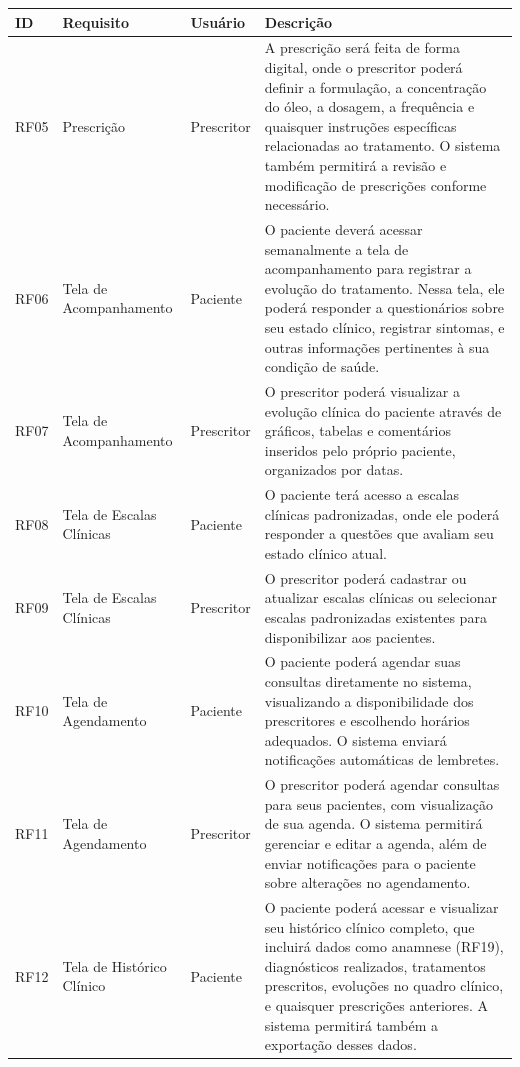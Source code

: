 \href{}{}\documentclass[12pt,portuguese,oneside]{article}
\begin{document}
\newpage

\begin{table}[H]
\centering
{}
\begin{tabularx}{\textwidth}{|>{\raggedright\arraybackslash}p{1cm}|>{\raggedright\arraybackslash}p{3cm}|>{\raggedright\arraybackslash}p{2cm}|>{\raggedright\arraybackslash}X|}
\hline
\rowcolor{gray!20}
\textbf{ID} & \textbf{Requisito} & \textbf{Usuário} & \textbf{Descrição}\\
\hline
RF05 & Prescrição & Prescritor & A prescrição será feita de forma digital, onde o prescritor poderá definir a formulação, a concentração do óleo, a dosagem, a frequência e quaisquer instruções específicas relacionadas ao tratamento. O sistema também permitirá a revisão e modificação de prescrições conforme necessário.\\
\hline
RF06 & Tela de Acompanhamento & Paciente & O paciente deverá acessar semanalmente a tela de acompanhamento para registrar a evolução do tratamento. Nessa tela, ele poderá responder a questionários sobre seu estado clínico, registrar sintomas, e outras informações pertinentes à sua condição de saúde.\\
\hline
RF07 & Tela de Acompanhamento & Prescritor & O prescritor poderá visualizar a evolução clínica do paciente através de gráficos, tabelas e comentários inseridos pelo próprio paciente, organizados por datas.\\
\hline
RF08 & Tela de Escalas Clínicas & Paciente & O paciente terá acesso a escalas clínicas padronizadas, onde ele poderá responder a questões que avaliam seu estado clínico atual.\\
\hline
RF09 & Tela de Escalas Clínicas & Prescritor & O prescritor poderá cadastrar ou atualizar escalas clínicas ou selecionar escalas padronizadas existentes para disponibilizar aos pacientes.\\
\hline
RF10 & Tela de Agendamento & Paciente & O paciente poderá agendar suas consultas diretamente no sistema, visualizando a disponibilidade dos prescritores e escolhendo horários adequados. O sistema enviará notificações automáticas de lembretes.\\
\hline
RF11 & Tela de Agendamento & Prescritor & O prescritor poderá agendar consultas para seus pacientes, com visualização de sua agenda. O sistema permitirá gerenciar e editar a agenda, além de enviar notificações para o paciente sobre alterações no agendamento.\\
\hline
RF12 & Tela de Histórico Clínico & Paciente & O paciente poderá acessar e visualizar seu histórico clínico completo, que incluirá dados como anamnese (RF19), diagnósticos realizados, tratamentos prescritos, evoluções no quadro clínico, e quaisquer prescrições anteriores. A sistema permitirá também a exportação desses dados.\\
\hline
\end{tabularx}
\end{table}
\end{document}
